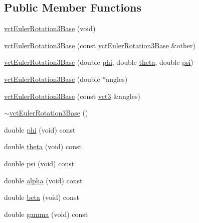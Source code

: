 \subsection*{Public Member Functions}
\begin{DoxyCompactItemize}
\item 
\hyperlink{classvct_euler_rotation3_base_ae1f9e5e19f7cdcc730e654a6fb6e8eac}{vct\+Euler\+Rotation3\+Base} (void)
\item 
\hyperlink{classvct_euler_rotation3_base_addcff20799832d83b777e33cd7291da4}{vct\+Euler\+Rotation3\+Base} (const \hyperlink{classvct_euler_rotation3_base}{vct\+Euler\+Rotation3\+Base} \&other)
\item 
\hyperlink{classvct_euler_rotation3_base_a0c71f3b2255a2eb4027161881b88771a}{vct\+Euler\+Rotation3\+Base} (double \hyperlink{classvct_euler_rotation3_base_af2e807e479e504cd47c58b308f25317c}{phi}, double \hyperlink{classvct_euler_rotation3_base_ac74e14d30f7d2077068e2f4b5c7219b1}{theta}, double \hyperlink{classvct_euler_rotation3_base_aeee06e33924728dd210644a390f86522}{psi})
\item 
\hyperlink{classvct_euler_rotation3_base_a32cfaad298a332212b8d8f0ac430eb90}{vct\+Euler\+Rotation3\+Base} (double $\ast$angles)
\item 
\hyperlink{classvct_euler_rotation3_base_a3b85dbf47bf87636f63a1094c3789307}{vct\+Euler\+Rotation3\+Base} (const \hyperlink{vct_fixed_size_vector_types_8h_a3af82acdbf4eeb73c551909240b106ea}{vct3} \&angles)
\item 
\hyperlink{classvct_euler_rotation3_base_ae1b3d729b1a71349c469fe2ba0131745}{$\sim$vct\+Euler\+Rotation3\+Base} ()
\item 
double \hyperlink{classvct_euler_rotation3_base_af2e807e479e504cd47c58b308f25317c}{phi} (void) const 
\item 
double \hyperlink{classvct_euler_rotation3_base_ac74e14d30f7d2077068e2f4b5c7219b1}{theta} (void) const 
\item 
double \hyperlink{classvct_euler_rotation3_base_aeee06e33924728dd210644a390f86522}{psi} (void) const 
\item 
double \hyperlink{classvct_euler_rotation3_base_ac648a310804247d41cc6d69e958a3f57}{alpha} (void) const 
\item 
double \hyperlink{classvct_euler_rotation3_base_a48cc19ba0de0496bbfdb9b888aee5b6d}{beta} (void) const 
\item 
double \hyperlink{classvct_euler_rotation3_base_a8b3468e75b5aedef2db7bf613969215c}{gamma} (void) const 
\item 

\end{DoxyCompactItemize}
